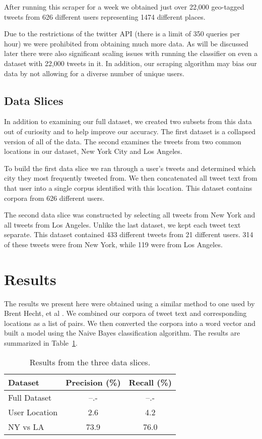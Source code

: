 \documentclass[12pt]{article}
\begin{document}
After running this scraper for a week we obtained just over 22,000 geo-tagged tweets from 626 different users representing 1474 different places.

Due to the restrictions of the twitter API (there is a limit of 350 queries per hour) we were prohibited from obtaining much more data. As will be discussed later there were also significant scaling issues with running the classifier on even a dataset with 22,000 tweets in it. In addition, our scraping algorithm may bias our data by not allowing for a diverse number of unique users. 

\subsection*{Data Slices}
In addition to examining our full dataset, we created two subsets from this data out of curiosity and to help improve our accuracy. The first dataset is a collapsed version of all of the data. The second examines the tweets from two common locations in our dataset, New York City and Los Angeles. 

To build the first data slice we ran through a user's tweets and determined which city they most frequently tweeted from. We then concatenated all tweet text from that user into a single corpus identified with this location. This dataset contains corpora from 626 different users. 

The second data slice was constructed by selecting all tweets from New York and all tweets from Los Angeles. Unlike the last dataset, we kept each tweet text separate. This dataset contained 433 different tweets from 21 different users. 314 of these tweets were from New York, while 119 were from Los Angeles. 

\section*{Results}
The results we present here were obtained using a similar method to one used by Brent Hecht, et al \cite{bhecht}. We combined our corpora of tweet text and corresponding locations as a list of pairs. We then converted the corpora into a word vector and built a model using the Naive Bayes classification algorithm. The results are summarized in Table~\ref{table:results}. 
\begin{table}
	\begin{center}
		\begin{tabular}{| l || c | c |}
			\hline
			Dataset & Precision (\%) & Recall (\%) \\ \hline
			Full Dataset & --.- & --.- \\ \hline
			User Location & 2.6 & 4.2 \\ \hline
			NY vs LA & 73.9 & 76.0 \\
			\hline
		\end{tabular}
	\end{center}
	\caption{Results from the three data slices.}
	\label{table:results}
\end{table}
\end{document}
